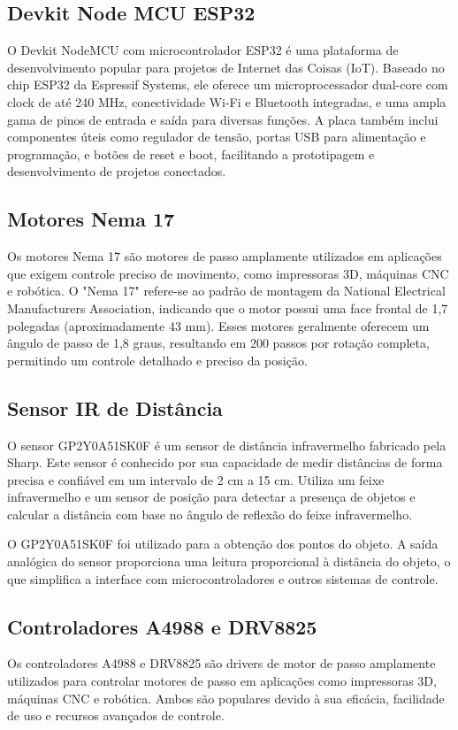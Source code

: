 \subsection{Devkit Node MCU ESP32}
O Devkit NodeMCU com microcontrolador ESP32 é uma plataforma de desenvolvimento popular para projetos de Internet das Coisas (IoT). Baseado no chip ESP32 da Espressif Systems, ele oferece um microprocessador dual-core com clock de até 240 MHz, conectividade Wi-Fi e Bluetooth integradas, e uma ampla gama de pinos de entrada e saída para diversas funções. A placa também inclui componentes úteis como regulador de tensão, portas USB para alimentação e programação, e botões de reset e boot, facilitando a prototipagem e desenvolvimento de projetos conectados.

\subsection{Motores Nema 17}
Os motores Nema 17 são motores de passo amplamente utilizados em aplicações que exigem controle preciso de movimento, como impressoras 3D, máquinas CNC e robótica. O "Nema 17" refere-se ao padrão de montagem da National Electrical Manufacturers Association, indicando que o motor possui uma face frontal de 1,7 polegadas (aproximadamente 43 mm). Esses motores geralmente oferecem um ângulo de passo de 1,8 graus, resultando em 200 passos por rotação completa, permitindo um controle detalhado e preciso da posição.

\subsection{Sensor IR de Distância}
O sensor GP2Y0A51SK0F é um sensor de distância infravermelho fabricado pela Sharp. Este sensor é conhecido por sua capacidade de medir distâncias de forma precisa e confiável em um intervalo de 2 cm a 15 cm. Utiliza um feixe infravermelho e um sensor de posição para detectar a presença de objetos e calcular a distância com base no ângulo de reflexão do feixe infravermelho.

O GP2Y0A51SK0F foi utilizado para a obtenção dos pontos do objeto. A saída analógica do sensor proporciona uma leitura proporcional à distância do objeto, o que simplifica a interface com microcontroladores e outros sistemas de controle.

\subsection{Controladores A4988 e DRV8825}
Os controladores A4988 e DRV8825 são drivers de motor de passo amplamente utilizados para controlar motores de passo em aplicações como impressoras 3D, máquinas CNC e robótica. Ambos são populares devido à sua eficácia, facilidade de uso e recursos avançados de controle.

